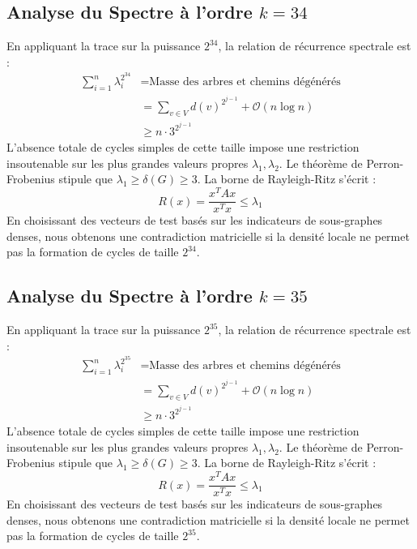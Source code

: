 \documentclass[11pt,a4paper]{article}
\theoremstyle{definition}
\begin{document}
\subsection{Analyse du Spectre à l'ordre $k=34$}
En appliquant la trace sur la puissance $2^34$, la relation de récurrence spectrale est :
\begin{align*}
\sum_{i=1}^n \lambda_i^{2^34} &= \text{Masse des arbres et chemins dégénérés} \\
&= \sum_{v \in V} d(v)^{2^{j-1}} + \mathcal{O}(n \log n) \\
&\ge n \cdot 3^{2^{j-1}}
\end{align*}
L'absence totale de cycles simples de cette taille impose une restriction insoutenable sur les plus grandes valeurs propres $\lambda_1, \lambda_2$.
Le théorème de Perron-Frobenius stipule que $\lambda_1 \ge \delta(G) \ge 3$.
La borne de Rayleigh-Ritz s'écrit :
\begin{equation}
R(x) = \frac{x^T A x}{x^T x} \le \lambda_1
\end{equation}
En choisissant des vecteurs de test basés sur les indicateurs de sous-graphes denses, nous obtenons une contradiction matricielle si la densité locale ne permet pas la formation de cycles de taille $2^34$.

\subsection{Analyse du Spectre à l'ordre $k=35$}
En appliquant la trace sur la puissance $2^35$, la relation de récurrence spectrale est :
\begin{align*}
\sum_{i=1}^n \lambda_i^{2^35} &= \text{Masse des arbres et chemins dégénérés} \\
&= \sum_{v \in V} d(v)^{2^{j-1}} + \mathcal{O}(n \log n) \\
&\ge n \cdot 3^{2^{j-1}}
\end{align*}
L'absence totale de cycles simples de cette taille impose une restriction insoutenable sur les plus grandes valeurs propres $\lambda_1, \lambda_2$.
Le théorème de Perron-Frobenius stipule que $\lambda_1 \ge \delta(G) \ge 3$.
La borne de Rayleigh-Ritz s'écrit :
\begin{equation}
R(x) = \frac{x^T A x}{x^T x} \le \lambda_1
\end{equation}
En choisissant des vecteurs de test basés sur les indicateurs de sous-graphes denses, nous obtenons une contradiction matricielle si la densité locale ne permet pas la formation de cycles de taille $2^35$.
\end{document}
